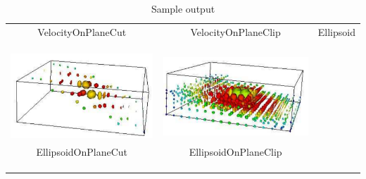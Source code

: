 \begin{table}[ht]
\begin{tabular}{c c c}
VelocityOnPlaneCut & VelocityOnPlaneClip & Ellipsoid \\ \\ \\ \\
\includegraphics[width=\thumbnailwidth]{figures/EllipsoidOnPlaneCut} & 
\includegraphics[width=\thumbnailwidth]{figures/EllipsoidOnPlaneClip} \\ 
EllipsoidOnPlaneCut & EllipsoidOnPlaneClip \\ \\ \\ \\
\end{tabular}
\caption{Sample output}
\end{table}

